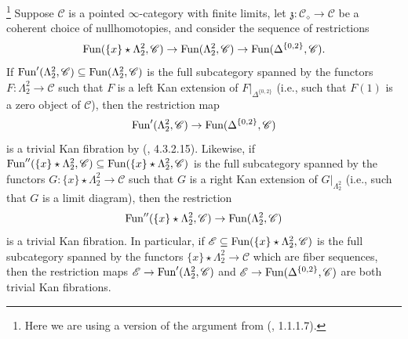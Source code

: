 \documentclass{tac}
\newcommand{\f}[1]{\mathfrak{#1}}
\newcommand{\s}[1]{\mathscr{#1}}
\newcommand{\tx}[1]{\textnormal{#1}}
\begin{document}
\begin{rmk}\footnote{Here we are using a version of the argument from (\cite{ha}, 1.1.1.7).} Suppose $\s{C}$ is a pointed $\infty$-category with finite limits, let $\f{z} : \s{C}_\diamond \to \s{C}$ be a coherent choice of nullhomotopies, and consider the sequence of restrictions
\[ \tx{Fun}(\{ x \}\star \Lambda^2_2 ,  \s{C}) \to \tx{Fun}( \Lambda^2_2 ,  \s{C}) \to \tx{Fun}( \Delta^{\{0,2 \}} ,  \s{C}). \]
If $\tx{Fun}'( \Lambda^2_2 ,  \s{C}) \subseteq \tx{Fun}( \Lambda^2_2 ,  \s{C})$ is the full subcategory spanned by the functors $F : \Lambda^2_2 \to \s{C}$ such that $F$ is a left Kan extension of $F|_{\Delta^{\{0,2 \}}}$ (i.e., such that $F(1)$ is a zero object of $\s{C}$), then the restriction map 
\[ \tx{Fun}'( \Lambda^2_2 ,  \s{C}) \to  \tx{Fun}( \Delta^{\{0,2 \}} ,  \s{C}) \]
is a trivial Kan fibration by (\cite{htt}, 4.3.2.15).  Likewise, if $\tx{Fun}''(\{ x \}\star \Lambda^2_2 ,  \s{C}) \subseteq \tx{Fun}(\{ x \}\star \Lambda^2_2 ,  \s{C})$ is the full subcategory spanned by the functors $G : \{ x\} \star \Lambda^2_2 \to \s{C}$ such that $G$ is a right Kan extension of $G|_{\Lambda^2_2}$ (i.e., such that $G$ is a limit diagram), then the restriction 
\[ \tx{Fun}''(\{ x \}\star \Lambda^2_2 ,  \s{C}) \to \tx{Fun}( \Lambda^2_2 ,  \s{C}) \]
is a trivial Kan fibration.  In particular, if $\s{E}\subseteq \tx{Fun}(\{ x \}\star \Lambda^2_2 ,  \s{C})$ is the full subcategory spanned by the functors $\{ x \}\star \Lambda^2_2 \to  \s{C}$ which are fiber sequences, then the restriction maps $\s{E} \to \tx{Fun}'( \Lambda^2_2 ,  \s{C})$ and $\s{E} \to \tx{Fun}( \Delta^{\{0,2 \}} ,  \s{C})$ are both trivial Kan fibrations.


\end{rmk}
\end{document}
